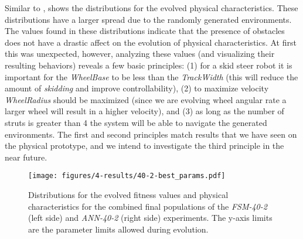 Similar to ,  shows the distributions for the evolved physical characteristics.
%
These distributions have a larger spread due to the randomly generated environments.
%
The values found in these distributions indicate that the presence of obstacles does not have a drastic affect on the evolution of physical characteristics.
%
At first this was unexpected, however, analyzing these values (and visualizing their resulting behaviors) reveals a few basic principles:
(1) for a skid steer robot it is important for the \emph{WheelBase} to be less than the \emph{TrackWidth} (this will reduce the amount of \emph{skidding} and improve controllability),
(2) to maximize velocity \emph{WheelRadius} should be maximized (since we are evolving wheel angular rate a larger wheel will result in a higher velocity), and
(3) as long as the number of struts is greater than 4 the system will be able to navigate the generated environments.
%
The first and second principles match results that we have seen on the physical prototype, and we intend to investigate the third principle in the near future.
%


\begin{figure}[!ht]
    \centering

    \texttt{[image: figures/4-results/40-2-best\_params.pdf]}


    \caption{Distributions for the evolved fitness values and physical characteristics for the combined final populations of the \emph{FSM-40-2} (left side) and \emph{ANN-40-2} (right side) experiments. The y-axis limits are the parameter limits allowed during evolution.}
    \label{fig:40-2-best-params}


\end{figure}



